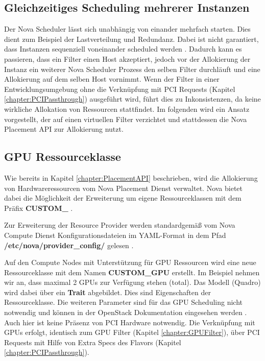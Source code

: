 \documentclass[../Main.tex]{subfiles}
\begin{document}
\subsection{Gleichzeitiges Scheduling mehrerer Instanzen}

Der Nova Scheduler lässt sich unabhängig von einander mehrfach starten. Dies dient zum Beispiel der Lastverteilung
und Redundanz. Dabei ist nicht garantiert, dass Instanzen sequenziell voneinander scheduled werden \citep{NovaScheduling}.
Dadurch kann es passieren, dass ein Filter einen Host akzeptiert, jedoch vor der Allokierung der Instanz ein weiterer Nova Scheduler Prozess den selben
Filter durchläuft und eine Allokierung auf dem selben Host vornimmt. Wenn der Filter in einer Entwicklungsumgebung
ohne die Verknüpfung mit PCI Requests (Kapitel \ref{chapter:PCIPassthrough}) ausgeführt wird, führt dies zu
Inkonsistenzen, da keine wirkliche Allokation von Ressourcen stattfindet. Im folgenden wird ein Ansatz vorgestellt, der auf einen virtuellen Filter verzichtet und stattdessen die Nova Placement API
zur Allokierung nutzt.

\subsection{GPU Ressourceklasse}
\label{chapter:GPUResourceClass}

Wie bereits in Kapitel \ref{chapter:PlacementAPI} beschrieben, wird die Allokierung von Hardwareressourcen vom Nova Placement
Dienst verwaltet. Nova bietet dabei die Möglichkeit der Erweiterung um eigene Ressourceklassen mit dem Präfix \textbf{CUSTOM\_} \citep{NovaCustomResourceClasses}.

Zur Erweiterung der Resource Provider werden standardgemä{\ss} vom Nova Compute Dienst Konfigurationsdateien im YAML-Format in dem Pfad \textbf{/etc/nova/provider\_config/} gelesen \citep{NovaConfigurationOptions}.

Auf den Compute Nodes mit Unterstützung für GPU Ressourcen wird eine neue Ressourceklasse mit dem Namen \textbf{CUSTOM\_GPU} erstellt. Im Beispiel
nehmen wir an, dass maximal 2 GPUs zur Verfügung stehen (total). Das Modell (Quadro) wird dabei über
ein \textbf{Trait} abgebildet. Dies sind Eigenschaften der Ressourceklasse. Die weiteren Parameter sind für das GPU Scheduling nicht notwendig und können
in der OpenStack Dokumentation eingesehen werden \citep{ProviderConfigFile}. Auch hier ist keine Präsenz von
PCI Hardware notwendig. Die Verknüpfung mit GPUs erfolgt, identisch zum GPU Filter (Kapitel \ref{chapter:GPUFilter}), über PCI Requests mit Hilfe von
Extra Specs des Flavors (Kapitel \ref{chapter:PCIPassthrough}).
\end{document}
